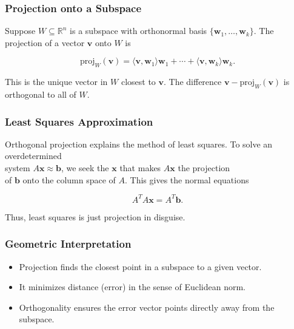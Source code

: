 \documentclass[
  12pt,
  a4paper,
]{article}
\begin{document}
\subsubsection{Projection onto a
Subspace}\label{projection-onto-a-subspace}

Suppose \(W \subseteq \mathbb{R}^n\) is a subspace with orthonormal
basis \(\{ \mathbf{w}_1, \dots, \mathbf{w}_k \}\). The\\
projection of a vector \(\mathbf{v}\) onto \(W\) is

\[\text{proj}_{W}(\mathbf{v}) = \langle \mathbf{v}, \mathbf{w}_1 \rangle \mathbf{w}_1 + \cdots + \langle \mathbf{v}, \mathbf{w}_k \rangle \mathbf{w}_k.\]

This is the unique vector in \(W\) closest to \(\mathbf{v}\). The
difference \(\mathbf{v} - \text{proj}_{W}(\mathbf{v})\) is\\
orthogonal to all of \(W\).

\subsubsection{Least Squares
Approximation}\label{least-squares-approximation}

Orthogonal projection explains the method of least squares. To solve an
overdetermined\\
system \(A\mathbf{x} \approx \mathbf{b}\), we seek the \(\mathbf{x}\)
that makes \(A\mathbf{x}\) the projection\\
of \(\mathbf{b}\) onto the column space of \(A\). This gives the normal
equations

\[A^T A \mathbf{x} = A^T \mathbf{b}.\]

Thus, least squares is just projection in disguise.

\subsubsection{Geometric
Interpretation}\label{geometric-interpretation-14}

\begin{itemize}
\item
  Projection finds the closest point in a subspace to a given vector.
\item
  It minimizes distance (error) in the sense of Euclidean norm.
\item
  Orthogonality ensures the error vector points directly away from the
  subspace.
\end{itemize}
\end{document}
